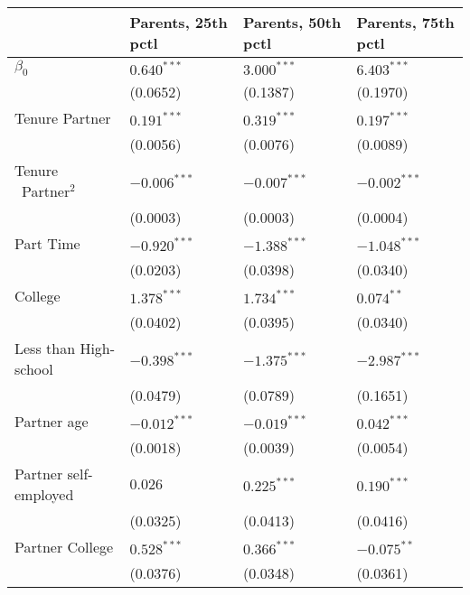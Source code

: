 \begin{tabular}{llll}
\toprule
{} & Parents, 25th pctl & Parents, 50th pctl & Parents, 75th pctl \\
\midrule
$\beta_0$                     &      $0.640^{***}$ &      $3.000^{***}$ &      $6.403^{***}$ \\
                              &           (0.0652) &           (0.1387) &           (0.1970) \\
Tenure Partner                &      $0.191^{***}$ &      $0.319^{***}$ &      $0.197^{***}$ \\
                              &           (0.0056) &           (0.0076) &           (0.0089) \\
Tenure \ Partner$^{2}$        &     $-0.006^{***}$ &     $-0.007^{***}$ &     $-0.002^{***}$ \\
                              &           (0.0003) &           (0.0003) &           (0.0004) \\
Part Time                     &     $-0.920^{***}$ &     $-1.388^{***}$ &     $-1.048^{***}$ \\
                              &           (0.0203) &           (0.0398) &           (0.0340) \\
College                       &      $1.378^{***}$ &      $1.734^{***}$ &       $0.074^{**}$ \\
                              &           (0.0402) &           (0.0395) &           (0.0340) \\
Less than High-school         &     $-0.398^{***}$ &     $-1.375^{***}$ &     $-2.987^{***}$ \\
                              &           (0.0479) &           (0.0789) &           (0.1651) \\
Partner age                   &     $-0.012^{***}$ &     $-0.019^{***}$ &      $0.042^{***}$ \\
                              &           (0.0018) &           (0.0039) &           (0.0054) \\
Partner self-employed         &            $0.026$ &      $0.225^{***}$ &      $0.190^{***}$ \\
                              &           (0.0325) &           (0.0413) &           (0.0416) \\
Partner College               &      $0.528^{***}$ &      $0.366^{***}$ &      $-0.075^{**}$ \\
                              &           (0.0376) &           (0.0348) &           (0.0361) \\

\end{tabular}
